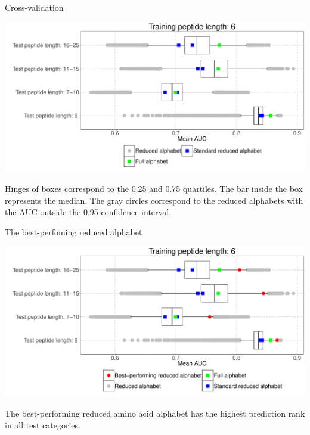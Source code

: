 \documentclass{beamer}\usepackage[]{graphicx}\usepackage[]{color}
\makeatletter
\def\maxwidth{ %
  \ifdim\Gin@nat@width>\linewidth
    \linewidth
  \else
    \Gin@nat@width
  \fi
}
\newenvironment{knitrout}{}{} %
\makeatother
\begin{document}
\begin{frame}{Cross-validation}
\begin{knitrout}
\color{fgcolor}

{\centering \includegraphics[width=\maxwidth]{figure/unnamed-chunk-3-1} 

}



\end{knitrout}
  \tiny
Hinges of boxes correspond to 
the 0.25 and 0.75 quartiles. The bar inside the box represents the median. The 
gray circles correspond to the reduced alphabets with the AUC outside the 0.95 
confidence interval.

  
  \end{frame}

  
    \begin{frame}{The best-perfoming reduced alphabet}
\begin{knitrout}
\color{fgcolor}

{\centering \includegraphics[width=\maxwidth]{figure/unnamed-chunk-4-1} 

}



\end{knitrout}
  

The best-performing reduced amino acid alphabet has the highest prediction rank in all test categories.
  
  \end{frame}
\end{document}
